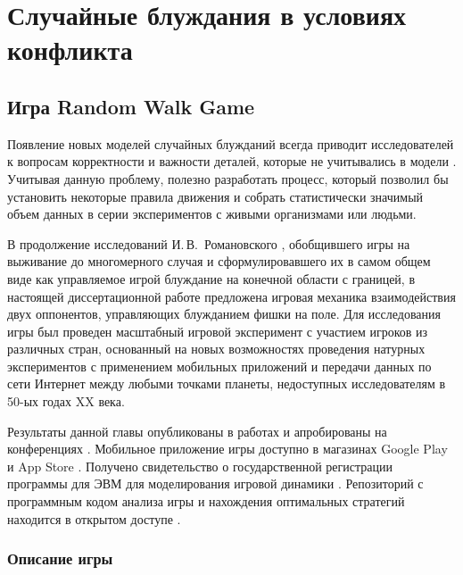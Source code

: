 \chapter{Случайные блуждания в условиях конфликта}\label{ch:ch3}


\section{Игра Random Walk Game}\label{sec:ch3/sec1}

Появление новых моделей случайных блужданий всегда приводит исследователей к вопросам корректности и важности деталей, которые не учитывались в модели \cite{pyke_understanding_2015, lascala-gruenewald_sensory_2019}. Учитывая данную проблему, полезно разработать процесс, который позволил бы установить некоторые правила движения и собрать статистически значимый объем данных в серии экспериментов с живыми организмами или людьми. 

В продолжение исследований И.\,В.~Романовского \cite{romanovsky_1961}, обобщившего игры на выживание до многомерного случая и сформулировавшего их в самом общем виде как управляемое игрой блуждание на конечной области с границей, в настоящей диссертационной работе предложена игровая механика взаимодействия двух оппонентов, управляющих блужданием фишки на поле. Для исследования игры был проведен масштабный игровой эксперимент с участием игроков из различных стран, основанный на новых возможностях проведения натурных экспериментов с применением мобильных приложений и передачи данных по сети Интернет между любыми точками планеты, недоступных исследователям в 50-ых годах XX века. 

Результаты данной главы опубликованы в работах \cite{bib3,bib4} и апробированы на конференциях \cite{confbib1,confbib2,confbib3,confbib4}. Мобильное приложение игры доступно в магазинах Google Play \cite{googleplay} и App Store \cite{applestore}. Получено свидетельство о государственной регистрации программы для ЭВМ для моделирования игровой динамики \cite{progbib1}. Репозиторий с программным кодом анализа игры и нахождения оптимальных стратегий находится в открытом доступе \cite{RWAnalyzer}. 



\subsection{Описание игры}\label{subsec:ch3/sec1/sub1}

